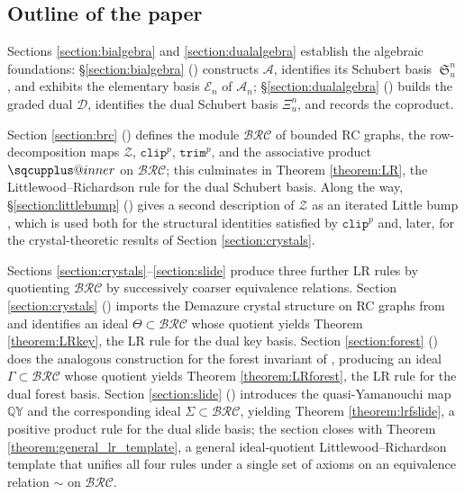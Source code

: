 \documentclass{amsart}
\makeatletter
\newcommand{\sqcupplus@inner}[2]{%
  \vcenter{\hbox{\ooalign{%
    \hfil$\m@th#1\sqcup$\hfil\cr
    \hfil\raisebox{0.15ex}{$\m@th#1\scriptscriptstyle+$}\hfil\cr
  }}}%
}
\newcommand{\sqcupplus}{\mathbin{\mathpalette\sqcupplus@inner\relax}}
\theoremstyle{definition}
\theoremstyle{remark}
\numberwithin{equation}{subsection}
\DeclareMathOperator{\sch}{\mathfrak{S}}
\newcommand{\QY}{\ensuremath{\mathbb{QY}}}
\newcommand{\trm}{\mathtt{trim}}
\newcommand{\zeromap}{\mathcal{Z}}
\newcommand{\clp}{\mathtt{clip}}
\newcommand{\BRC}{\mathcal{BRC}}
\newcommand{\dsch}{\ensuremath{\Xi}}
\newcommand{\coma}{\mathcal{A}}
\newcommand{\dcoma}{\mathcal{D}}
\makeatother
\begin{document}
\subsection*{Outline of the paper}

Sections \ref{section:bialgebra} and \ref{section:dualalgebra} establish the algebraic foundations: \S\ref{section:bialgebra} () constructs $\coma$, identifies its Schubert basis $\sch_u^n$, and exhibits the elementary basis $\mathcal{E}_n$ of $\coma_n$; \S\ref{section:dualalgebra} () builds the graded dual $\dcoma$, identifies the dual Schubert basis $\dsch_u^n$, and records the coproduct.

Section \ref{section:brc} () defines the module $\BRC$ of bounded RC graphs, the row-decomposition maps $\zeromap$, $\clp^p$, $\trm^p$, and the associative product $\sqcupplus$ on $\BRC$; this culminates in Theorem \ref{theorem:LR}, the Littlewood--Richardson rule for the dual Schubert basis. Along the way, \S\ref{section:littlebump} () gives a second description of $\zeromap$ as an iterated Little bump \cite{little2003combinatorial}, which is used both for the structural identities satisfied by $\clp^p$ and, later, for the crystal-theoretic results of Section \ref{section:crystals}.

Sections \ref{section:crystals}--\ref{section:slide} produce three further LR rules by quotienting $\BRC$ by successively coarser equivalence relations. Section \ref{section:crystals} () imports the Demazure crystal structure on RC graphs from \cite{assaf2018demazure} and identifies an ideal $\Theta\subset\BRC$ whose quotient yields Theorem \ref{theorem:LRkey}, the LR rule for the dual key basis. Section \ref{section:forest} () does the analogous construction for the forest invariant of \cite{nadeau2024forest}, producing an ideal $\Gamma\subset\BRC$ whose quotient yields Theorem \ref{theorem:LRforest}, the LR rule for the dual forest basis. Section \ref{section:slide} () introduces the quasi-Yamanouchi map $\QY$ and the corresponding ideal $\Sigma\subset\BRC$, yielding Theorem \ref{theorem:lrfslide}, a positive product rule for the dual slide basis; the section closes with Theorem \ref{theorem:general_lr_template}, a general ideal-quotient Littlewood--Richardson template that unifies all four rules under a single set of axioms on an equivalence relation $\sim$ on $\BRC$.
\end{document}
